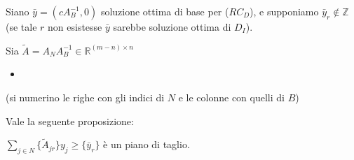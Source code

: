 \documentclass[a4paper,11pt]{book}
\newcommand{\reals}{\mathbb{R}}
\newcommand{\integers}{\mathbb{Z}}
\newcommand{\dsum}{\displaystyle\sum}
\theoremstyle{break}
\begin{document}
Siano $\bar y = (cA^{-1}_B, 0)$ soluzione ottima di base per ($RC_D$), e supponiamo $\bar y_r\notin \integers$ (se tale $r$ non esistesse $\bar y$ sarebbe soluzione ottima di $D_I$).\medskip
\begin{multicols}{2}
 
Sia $\tilde{A} = A_NA_B^{-1} \in \reals^{(m-n) \times n}$ 
\begin{itemize}
 \item []
\end{itemize}

(si numerino le righe con gli indici di $N$ e le colonne con quelli di $B$)
\end{multicols}
Vale la seguente proposizione:

\begin{center}
 
$\dsum_{j \in N}\{\tilde A_{jr}\} y_j \geq \{\bar y_r\}$ è un piano di taglio. 
 
\end{center}
\end{document}
